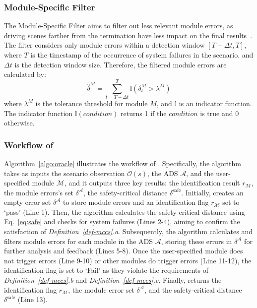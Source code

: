 \subsubsection{Module-Specific Filter}\label{sec:filter}
The Module-Specific Filter aims to filter out less relevant module errors, as driving scenes farther from the termination have less impact on the final results~\cite{stocco2020misbehaviour, stocco2022thirdeye}.
The filter considers only module errors within a detection window \([T - \Delta t, T]\), where \( T \) is the timestamp of the occurrence of system failures in the scenario, and \( \Delta t \) is the detection window size. Therefore, the filtered module errors are calculated by:
\begin{equation}\label{eq:system_error}
    \hat{\delta}^{{M}} = \sum_{t=T-\Delta t}^{T} \mathbb{I}(\delta_t^{{M}} > \lambda^{{M}})
\end{equation}
where \( \lambda^{{M}} \) is the tolerance threshold for module ${M}$, and \( \mathbb{I} \) is an indicator function. The indicator function \( \mathbb{I}(condition) \) returns 1 if the \( condition \) is true and 0 otherwise. 

\subsubsection{Workflow of \oracle}
Algorithm~\ref{algo:oracle} illustrates the workflow of \oracle.
Specifically, the algorithm takes as inputs the scenario observation \( \mathcal{O}(s) \), the ADS \( \mathcal{A} \), and the user-specified module \( \mathcal{M} \), and it outputs three key results: the identification result \( r_{\mathcal{M}} \), the module errors's set \( \delta^{\mathcal{A}} \), the safety-critical distance \( \delta^{\text{safe}} \). 
Initially, \oracle creates an empty error set \( \delta^{\mathcal{A}} \) to store module errors and an identification flag \( r_{\mathcal{M}} \) set to `pass' (Line 1). Then, the algorithm calculates the safety-critical distance using Eq.~\ref{eq:safe} and checks for system failures (Lines 2-4), aiming to confirm the satisfaction of \textit{Definition~\ref{def-mccs}.a}.
Subsequently, the algorithm calculates and filters module errors for each module in the ADS \( \mathcal{A} \), storing these errors in \( \delta^{\mathcal{A}} \) for further analysis and feedback (Lines 5-8).
Once the user-specified module does not trigger errors (Line 9-10) or other modules do trigger errors (Line 11-12), the identification flag is set to `Fail' as they violate the requirements of \textit{Definition~\ref{def-mccs}.b} and \textit{Definition~\ref{def-mccs}.c}. 
Finally, \oracle returns the identification flag \( r_{\mathcal{M}} \), the module error set \( \delta^{\mathcal{A}} \), and the safety-critical distance \( \delta^{\text{safe}} \) (Line 13).





